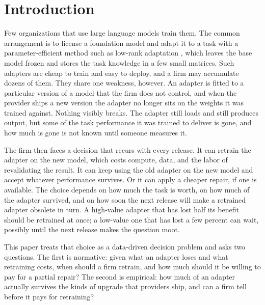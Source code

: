 \documentclass[ijds,blindrev]{informs4}
\begin{document}
\section{Introduction}\label{sec:intro}

Few organizations that use large language models train them. The common arrangement is to license a foundation model and adapt it to a task with a parameter-efficient method such as low-rank adaptation \citep[LoRA;][]{hu2022lora}, which leaves the base model frozen and stores the task knowledge in a few small matrices. Such adapters are cheap to train and easy to deploy, and a firm may accumulate dozens of them. They share one weakness, however. An adapter is fitted to a particular version of a model that the firm does not control, and when the provider ships a new version the adapter no longer sits on the weights it was trained against. Nothing visibly breaks. The adapter still loads and still produces output, but some of the task performance it was trained to deliver is gone, and how much is gone is not known until someone measures it.

The firm then faces a decision that recurs with every release. It can retrain the adapter on the new model, which costs compute, data, and the labor of revalidating the result. It can keep using the old adapter on the new model and accept whatever performance survives. Or it can apply a cheaper repair, if one is available. The choice depends on how much the task is worth, on how much of the adapter survived, and on how soon the next release will make a retrained adapter obsolete in turn. A high-value adapter that has lost half its benefit should be retrained at once; a low-value one that has lost a few percent can wait, possibly until the next release makes the question moot.

This paper treats that choice as a data-driven decision problem and asks two questions. The first is normative: given what an adapter loses and what retraining costs, when should a firm retrain, and how much should it be willing to pay for a partial repair? The second is empirical: how much of an adapter actually survives the kinds of upgrade that providers ship, and can a firm tell before it pays for retraining?
\end{document}
